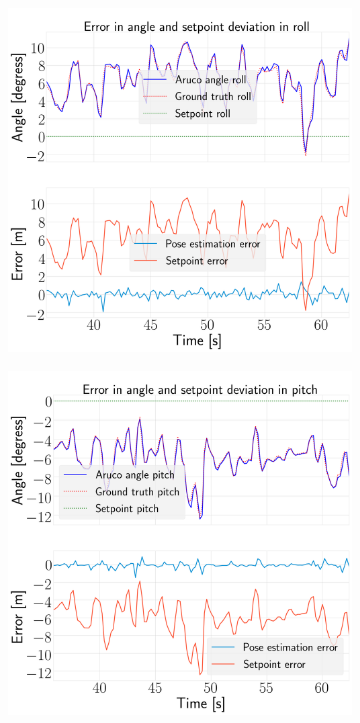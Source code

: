 \documentclass[../Head/report.tex]{subfiles}
\begin{document}
\begin{figure}[H]
    \centering
    \begin{subfigure}[t]{.30\textwidth}
        \centering
        \includegraphics[width=\textwidth]{../Figures/hold_pose_using_aruco_pose_estimation/test2_gps2visionBoard_1.0Wind_-1.0y/error_roll/pose_error_roll_test1.png}
        \caption{}
        \label{fig:hold_pose_estimation_test2_roll}
    \end{subfigure}
     \hspace{0.2em}
    \begin{subfigure}[t]{.30\textwidth}
        \centering
        \includegraphics[width=\textwidth]{../Figures//hold_pose_using_aruco_pose_estimation/test2_gps2visionBoard_1.0Wind_-1.0y/error_pitch/pose_error_pitch_test1.png}

\end{subfigure}
\end{figure}
\end{document}
